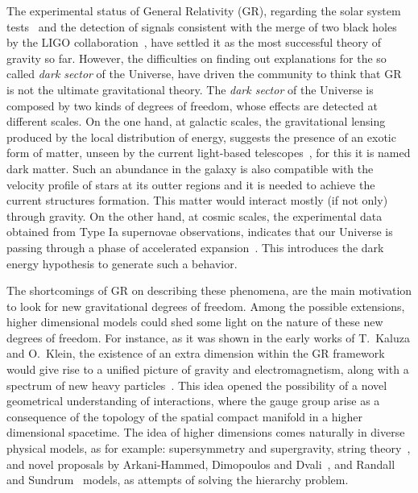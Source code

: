 \documentclass[aps,prd,12pt,superscriptaddress,showpacs,showkeys,longbibliography,reprint,nofootinbib]{revtex4-1}
\begin{document}
The experimental status of General Relativity (GR), regarding the solar system tests~\cite{Will:2014kxa} and the detection of signals consistent with the merge of two black holes by the LIGO collaboration~\cite{Abbott:2016blz,Abbott:2016nmj}, have settled it as the most successful theory of gravity so far. However, the difficulties on finding out explanations for the so called \emph{dark sector} of the Universe,
have driven the community to think that GR is not the ultimate gravitational theory. 
The \emph{dark sector} of the Universe is composed by two kinds of degrees of freedom, whose effects are detected at different scales. On the one hand, at galactic scales, the gravitational lensing produced by the local distribution of energy, suggests the presence of an exotic form of matter, unseen by the current light-based telescopes~\cite{Sofue:2000jx}, for this it is named dark matter. Such an abundance in the galaxy is also compatible with the velocity profile of stars at its outter regions and it is needed to achieve the current structures formation. This matter would interact mostly (if not only) through gravity. On the other hand, at cosmic scales, the experimental data obtained from Type Ia supernovae observations, indicates that our Universe is passing through a phase of accelerated expansion~\cite{Riess:1998cb}. This introduces the dark energy hypothesis to generate such a behavior. 

The shortcomings of GR on describing these phenomena, are the main motivation to look for new gravitational degrees of freedom. Among the possible extensions, higher dimensional models could shed some light on the nature of these new degrees of freedom. For instance, as it was shown in the early works of T.~Kaluza and O.~Klein, the existence of an extra dimension within the GR framework would give rise to a unified picture of gravity and electromagnetism, along with a spectrum of new heavy particles~\cite{Kaluza:1921tu,*Klein:1926tv}. This idea opened the possibility of a novel geometrical understanding of interactions, where the gauge group arise as a consequence of the topology of the spatial compact manifold in a higher dimensional spacetime. The idea of higher dimensions comes naturally in diverse physical models, as for example: supersymmetry and supergravity, string theory~\cite{Green:1987sp,*Green:1987mn}, and novel proposals by Arkani-Hammed, Dimopoulos and Dvali~\cite{ArkaniHamed:1998rs,*Antoniadis:1998ig}, and Randall and Sundrum~\cite{Randall:1999ee,*Randall:1999vf} models, as attempts of solving the hierarchy problem.
\end{document}
